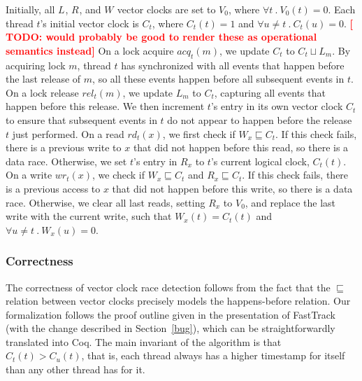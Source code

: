 \documentclass[preprint, 10pt]{sigplanconf}
\newcommand{\TODO}[1]{\textbf{\textcolor{red}{[ TODO: #1]}}}
\newcommand{\Tid}{t}
\newcommand{\TidU}{u}
\newcommand{\Address}{x}
\newcommand{\Value}{b}
\newcommand{\Lock}{m}
\newcommand{\ReadOp}[3]{rd_{#1}(#2)}
\newcommand{\WriteOp}[3]{wr_{#1}(#2)}
\newcommand{\AcqOp}[2]{acq_{#1}(#2)}
\newcommand{\RelOp}[2]{rel_{#1}(#2)}
\newcommand{\VC}{V}
\newcommand{\VCFont}{}
\newcommand{\ThreadVC}[1]{\VCFont{C}_{#1}}
\newcommand{\LockVC}[1]{\VCFont{L}_{#1}}
\newcommand{\ReadVC}[1]{\VCFont{R}_{#1}}
\newcommand{\WriteVC}[1]{\VCFont{W}_{#1}}
\newcommand{\Bind}{\ .\ }
\newcommand{\VCMax}{\sqcup}
\newcommand{\VCCompare}{\sqsubseteq}
\begin{document}
Initially, all $\LockVC{}$, $\ReadVC{}$, and $\WriteVC{}$ vector clocks are
set to $\VC_0$, where $\forall \Tid \Bind \VC_0(\Tid) = 0$.  Each thread $\Tid$'s
initial vector clock is $\ThreadVC{\Tid}$, where $\ThreadVC{\Tid}(\Tid) = 1$
and $\forall \TidU \neq \Tid \Bind \ThreadVC{\Tid}(\TidU) = 0$.  \TODO{would probably be good to render these as operational semantics instead} On a lock
acquire $\AcqOp{\Tid}{\Lock}$, we update $\ThreadVC{\Tid}$ to
$\ThreadVC{\Tid} \VCMax \LockVC{\Lock}$.  By acquiring lock $\Lock$, thread
$\Tid$ has synchronized with all events that happen before the last release of
$\Lock$, so all these events happen before all subsequent events in $\Tid$.  On
a lock release $\RelOp{\Tid}{\Lock}$, we update $\LockVC{\Lock}$ to
$\ThreadVC{\Tid}$, capturing all events that happen before this release.  We
then increment $\Tid$'s entry in its own vector clock $\ThreadVC{\Tid}$ to
ensure that subsequent events in $\Tid$ do not appear to happen before the
release $\Tid$ just performed.  On a read $\ReadOp{\Tid}{\Address}{\Value}$, we
first check if $\WriteVC{\Address} \VCCompare \ThreadVC{\Tid}$.  If this
check fails, there is a previous write to $\Address$ that did not happen
before this read, so there is a data race.  Otherwise, we set
$\Tid$'s entry in $\ReadVC{\Address}$ to $\Tid$'s current logical clock,
$\ThreadVC{\Tid}(\Tid)$.  On a write
$\WriteOp{\Tid}{\Address}{\Value}$, we check if $\WriteVC{\Address}
\VCCompare \ThreadVC{\Tid}$ and $\ReadVC{\Address} \VCCompare \ThreadVC{\Tid}$.  If
this check fails, there is a previous access to $\Address$ that did not
happen before this write, so there is a data race.  Otherwise, we
clear all last reads, setting $\ReadVC{\Address}$ to $\VC_0$, and replace the
last write with the current write, such that $\WriteVC{\Address}(\Tid) =
\ThreadVC{\Tid}(\Tid)$ and $\forall \TidU \neq \Tid \Bind
  \WriteVC{\Address}(\TidU) = 0$.


\subsubsection{Correctness}
The correctness of vector clock race detection follows from the fact that the $\sqsubseteq$ relation between vector clocks precisely models the happens-before relation. Our formalization follows the proof outline given in the presentation of FastTrack~\cite{fasttrack} (with the change described in Section~\ref{bug}), which can be straightforwardly translated into Coq. The main invariant of the algorithm is that $C_t(t) > C_u(t)$, that is, each thread always has a higher timestamp for itself than any other thread has for it.
\end{document}
